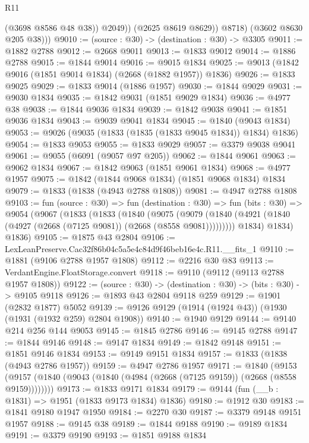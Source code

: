 \begin{lexlean}{R11}
\begin{coremodule}
                  (@3698 @8586 @48 @38))
                @2049))
            (@2625 @8619 @8629))
          @8718)
        (@3602 @8630 @205 @38)))
@9010 := (source : @30) -> (destination : @30) -> @3305
@9011 := @1882 @2788
@9012 := @2668 @9011
@9013 := @1833 @9012
@9014 := @1886 @2788
@9015 := @1844 @9014
@9016 := @9015 @1834
@9025 := @9013 (@1842 @9016 (@1851 @9014 @1834) (@2668 (@1882 @1957)) @1836)
@9026 := @1833 @9025
@9029 := @1833 @9014 (@1886 @1957)
@9030 := @1844 @9029
@9031 := @9030 @1834
@9035 := @1842 @9031 (@1851 @9029 @1834)
@9036 := @4977 @38
@9038 := @1844 @9036 @1834
@9039 := @1842 @9038
@9041 := @1851 @9036 @1834
@9043 := @9039 @9041 @1834
@9045 := @1840 (@9043 @1834)
@9053 := @9026 (@9035 (@1833 (@1835 (@1833 @9045 @1834)) @1834) @1836)
@9054 := @1833 @9053
@9055 := @1833 @9029
@9057 := @3379 @9038 @9041
@9061 := @9055 (@6091 (@9057 @97 @205))
@9062 := @1844 @9061
@9063 := @9062 @1834
@9067 := @1842 @9063 (@1851 @9061 @1834)
@9068 := @4977 @1957
@9075 := @1842 (@1844 @9068 @1834) (@1851 @9068 @1834) @1834
@9079 := @1833 (@1838 (@4943 @2788 @1808))
@9081 := @4947 @2788 @1808
@9103 := fun (source : @30) =>
  fun (destination : @30) =>
  fun (bits : @30) =>
  @9054
    (@9067
      (@1833
        (@1833
          (@1840
            (@9075
              (@9079 (@1840 (@4921 (@1840 (@4927 (@2668 (@7125 @9081)) (@2668 (@8558 @9081)))))))))
          @1834)
        @1834)
      @1836)
@9105 := @1875 @43 @2804
@9106 := LexLeanPreserve.Cac32f86b04c5a5e4c84d9f46beb16e4c.R11.__fits_1
@9110 := @1881 (@9106 @2788 @1957 @1808)
@9112 := @2216 @30 @83
@9113 := VerdantEngine.FloatStorage.convert
@9118 := @9110 (@9112 (@9113 @2788 @1957 @1808))
@9122 := (source : @30) -> (destination : @30) -> (bits : @30) -> @9105 @9118
@9126 := @1893 @43 @2804 @9118 @259
@9129 := @1901 (@2832 @1877) @5052
@9139 := @9126 @9129 (@1914 (@1924 @43)) (@1930 (@1931 (@1932 @259) @2804 @1908))
@9140 := @1940 @9129
@9144 := @9140 @214 @256 @144 @9053
@9145 := @1845 @2786
@9146 := @9145 @2788
@9147 := @1844 @9146
@9148 := @9147 @1834
@9149 := @1842 @9148
@9151 := @1851 @9146 @1834
@9153 := @9149 @9151 @1834
@9157 := @1833 (@1838 (@4943 @2786 @1957))
@9159 := @4947 @2786 @1957
@9171 := @1840
    (@9153 (@9157 (@1840 (@9043 (@1840 (@4984 (@2668 (@7125 @9159)) (@2668 (@8558 @9159))))))))
@9173 := @1833 @9171 @1834
@9179 := @9144 (fun (__b : @1831) => @1951 (@1833 @9173 @1834) @1836)
@9180 := @1912 @30
@9183 := @1841 @9180 @1947 @1950
@9184 := @2270 @30
@9187 := @3379 @9148 @9151 @1957
@9188 := @9145 @38
@9189 := @1844 @9188
@9190 := @9189 @1834
@9191 := @3379 @9190
@9193 := @1851 @9188 @1834

\end{coremodule}
\end{lexlean}

